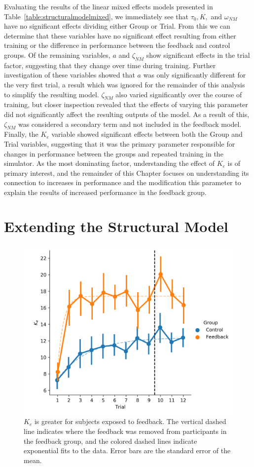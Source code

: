 Evaluating the results of the linear mixed effects models presented in Table~\ref{table:structuralmodelmixed}, we immediately see that $\tau_0, K,$ and $\omega_{NM}$ have no significant effects dividing either Group or Trial.
From this we can determine that these variables have no significant effect resulting from either training or the difference in performance between the feedback and control groups.
Of the remaining variables, $a$ and $\zeta_{NM}$ show significant effects in the trial factor, suggesting that they change over time during training.
Further investigation of these variables showed that $a$ was only significantly different for the very first trial, a result which was ignored for the remainder of this analysis to simplify the resulting model.
$\zeta_{NM}$ also varied significantly over the course of training, but closer inspection revealed that the effects of varying this parameter did not significantly affect the resulting outputs of the model.
As a result of this, $\zeta_{NM}$ was considered a secondary term and not included in the feedback model.
Finally, the $K_e$ variable showed significant effects between both the Group and Trial variables, suggesting that it was the primary parameter responsible for changes in performance between the groups and repeated training in the simulator.
As the most dominating factor, understanding the effect of $K_e$ is of primary interest, and the remainder of this Chapter focuses on understanding its connection to increases in performance and the modification this parameter to explain the results of increased performance in the feedback group.

\section{Extending the Structural Model}
\begin{figure}[tb]
    \centering
    \includegraphics[width=0.8\linewidth]{figures/Modeling/ke_group.png}
    \caption[$K_e$ is greater for subjects exposed to feedback]{$K_e$ is greater for subjects exposed to feedback.
        The vertical dashed line indicates where the feedback was removed from participants in the feedback group, and the colored dashed lines indicate exponential fits to the data.
        Error bars are the standard error of the mean.}
    \label{fig:ke_group}
\end{figure}

